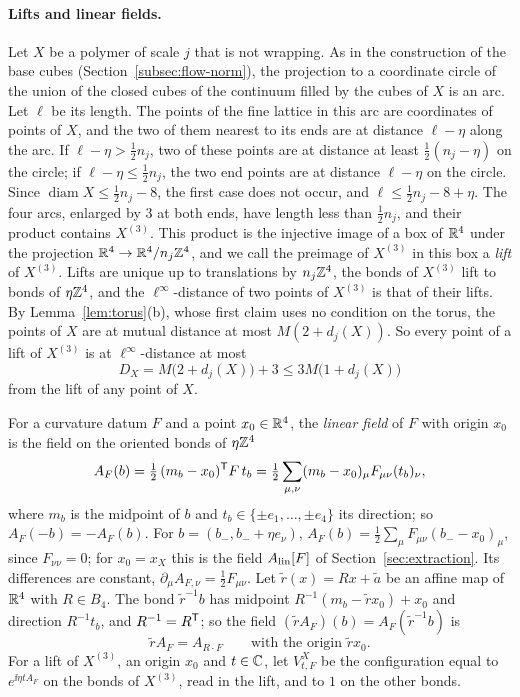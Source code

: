 \paragraph{Lifts and linear fields.} Let $X$ be a polymer of scale $j$ that is not wrapping. As in the construction of the base cubes (Section~\ref{subsec:flow-norm}), the projection to a coordinate circle of the union of the closed cubes of the continuum filled by the cubes of $X$ is an arc. Let $\ell$ be its length. The points of the fine lattice in this arc are coordinates of points of $X$, and the two of them nearest to its ends are at distance $\ell-\eta$ along the arc. If $\ell-\eta>\frac12n_j$, two of these points are at distance at least $\frac12(n_j-\eta)$ on the circle; if $\ell-\eta\le\frac12n_j$, the two end points are at distance $\ell-\eta$ on the circle. Since $\operatorname{diam}X\le\frac12n_j-8$, the first case does not occur, and $\ell\le\frac12n_j-8+\eta$. The four arcs, enlarged by $3$ at both ends, have length less than $\frac12n_j$, and their product contains $X^{(3)}$. This product is the injective image of a box of $\mathbb R^4$ under the projection $\mathbb R^4\to\mathbb R^4/n_j\mathbb Z^4$, and we call the preimage of $X^{(3)}$ in this box a \emph{lift} of $X^{(3)}$. Lifts are unique up to translations by $n_j\mathbb Z^4$, the bonds of $X^{(3)}$ lift to bonds of $\eta\mathbb Z^4$, and the $\ell^\infty$-distance of two points of $X^{(3)}$ is that of their lifts. By Lemma~\ref{lem:torus}(b), whose first claim uses no condition on the torus, the points of $X$ are at mutual distance at most $M(2+d_j(X))$. So every point of a lift of $X^{(3)}$ is at $\ell^\infty$-distance at most
\[
D_X=M\big(2+d_j(X)\big)+3\le3M\big(1+d_j(X)\big)
\]
from the lift of any point of $X$.

For a curvature datum $F$ and a point $x_0\in\mathbb R^4$, the \emph{linear field} of $F$ with origin $x_0$ is the field on the oriented bonds of $\eta\mathbb Z^4$
\[
A_F(b)=\tfrac12\,(m_b-x_0)^{\sf T}F\,t_b=\tfrac12\sum_{\mu,\nu}(m_b-x_0)_\mu F_{\mu\nu}(t_b)_\nu ,
\]
where $m_b$ is the midpoint of $b$ and $t_b\in\{\pm e_1,\dots,\pm e_4\}$ its direction; so $A_F(-b)=-A_F(b)$. For $b=(b_-,b_-+\eta e_\nu)$, $A_F(b)=\frac12\sum_\mu F_{\mu\nu}(b_--x_0)_\mu$, since $F_{\nu\nu}=0$; for $x_0=x_X$ this is the field $A_{\rm lin}[F]$ of Section~\ref{sec:extraction}. Its differences are constant, $\partial_\mu A_{F,\nu}=\frac12F_{\mu\nu}$. Let $\tilde r(x)=Rx+\tilde a$ be an affine map of $\mathbb R^4$ with $R\in B_4$. The bond $\tilde r^{-1}b$ has midpoint $R^{-1}(m_b-\tilde rx_0)+x_0$ and direction $R^{-1}t_b$, and $R^{-1}=R^{\sf T}$; so the field $(\tilde rA_F)(b)=A_F(\tilde r^{-1}b)$ is
\begin{equation}\label{eq:linear-field-covariance}
\tilde rA_F=A_{R\cdot F}\qquad\text{with the origin }\tilde rx_0 .
\end{equation}
For a lift of $X^{(3)}$, an origin $x_0$ and $t\in\mathbb C$, let $V^X_{t,F}$ be the configuration equal to $e^{\ii\eta tA_F}$ on the bonds of $X^{(3)}$, read in the lift, and to $1$ on the other bonds.


